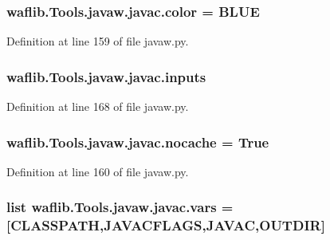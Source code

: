 \subsubsection[{\texorpdfstring{color}{color}}]{ waflib.\+Tools.\+javaw.\+javac.\+color = \textquotesingle{}B\+L\+UE\textquotesingle{}\hspace{0.3cm}{\ttfamily [static]}}\hypertarget{classwaflib_1_1_tools_1_1javaw_1_1javac_a71f0a24ebb1d548ca2d87728a4ff7e10}{}\label{classwaflib_1_1_tools_1_1javaw_1_1javac_a71f0a24ebb1d548ca2d87728a4ff7e10}


Definition at line 159 of file javaw.\+py.

\subsubsection[{\texorpdfstring{inputs}{inputs}}]{\setlength{\rightskip}{0pt plus 5cm}waflib.\+Tools.\+javaw.\+javac.\+inputs}\hypertarget{classwaflib_1_1_tools_1_1javaw_1_1javac_ae24e86ec2bf289076bc861f82abc1a43}{}\label{classwaflib_1_1_tools_1_1javaw_1_1javac_ae24e86ec2bf289076bc861f82abc1a43}


Definition at line 168 of file javaw.\+py.

\subsubsection[{\texorpdfstring{nocache}{nocache}}]{ waflib.\+Tools.\+javaw.\+javac.\+nocache = True\hspace{0.3cm}{\ttfamily [static]}}\hypertarget{classwaflib_1_1_tools_1_1javaw_1_1javac_ac245a50425914fe8ccbcfa07dd92ffbd}{}\label{classwaflib_1_1_tools_1_1javaw_1_1javac_ac245a50425914fe8ccbcfa07dd92ffbd}


Definition at line 160 of file javaw.\+py.

\subsubsection[{\texorpdfstring{vars}{vars}}]{\setlength{\rightskip}{0pt plus 5cm}list waflib.\+Tools.\+javaw.\+javac.\+vars = \mbox{[}\textquotesingle{}C\+L\+A\+S\+S\+P\+A\+TH\textquotesingle{},\textquotesingle{}J\+A\+V\+A\+C\+F\+L\+A\+GS\textquotesingle{},\textquotesingle{}J\+A\+V\+AC\textquotesingle{},\textquotesingle{}O\+U\+T\+D\+IR\textquotesingle{}\mbox{]}\hspace{0.3cm}{\ttfamily [static]}}\hypertarget{classwaflib_1_1_tools_1_1javaw_1_1javac_aca17834543bd5eff16b1e8d858785c85}{}\label{classwaflib_1_1_tools_1_1javaw_1_1javac_aca17834543bd5eff16b1e8d858785c85}


